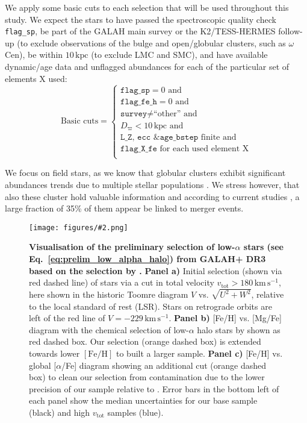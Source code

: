 \documentclass[fleqn,usenatbib]{mnras}
\newcommand{\kpc}{\,\mathrm{kpc}}	%
\newcommand{\kms}{\,\mathrm{km\,s^{-1}}}	%
\newcommand{\codeicon}{{\faCloudDownload}}
\newcommand{\codelink}[1]{\href{https://github.com/svenbuder/buder_galah_accreted_chemistry/tree/main/figures/#1.ipynb}{\codeicon}\,\,}
\newcommand{\oscaption}[2]{\caption{#2 \codelink{#1}}}
\newcommand{\figuretextwidth}[4]{\begin{figure*} \centering \texttt{[image: figures/\#2.png]}\oscaption{#3}{#4}\label{fig:#2} \end{figure*}}
\begin{document}
We apply some basic cuts to each selection that will be used throughout this study. We expect the stars to have passed the spectroscopic quality check \texttt{flag\_sp}, be part of the GALAH main survey or the K2/TESS-HERMES follow-up (to exclude observations of the bulge and open/globular clusters, such as $\omega$Cen), be within $10 \kpc$ (to exclude LMC and SMC), and have available dynamic/age data and unflagged abundances for each of the particular set of elements X used:\begin{equation} \label{eq:basic_cuts}
\text{Basic cuts} = 
\begin{cases}
\texttt{flag\_sp} = 0 \text{ and} \\
\texttt{flag\_fe\_h} = 0 \text{ and} \\
\texttt{survey} \neq \text{``other'' and} \\
D_\varpi < 10\kpc \text{ and} \\
\texttt{L\_Z}\text{, }\texttt{ecc}\text{ \& }\texttt{age\_bstep} \text{ finite and} \\
\texttt{flag\_X\_fe} \text{ for each used element X} \\
\end{cases}
\end{equation}

We focus on field stars, as we know that globular clusters exhibit significant abundances trends due to multiple stellar populations \citep[e.g.][]{Carretta2009}. We stress however, that also these cluster hold valuable information and according to current studies \citep[e.g.][]{Massari2019, KochHansen2021}, a large fraction of 35\% of them appear be linked to merger events.

\figuretextwidth{14.75cm}{nissen_selection_corner}{chemical_differences}{
\textbf{Visualisation of the preliminary selection of low-$\alpha$ stars (see Eq.~\ref{eq:prelim_low_alpha_halo}) from GALAH+ DR3 based on the selection by \citet{Nissen2010}.}
\textbf{Panel a)} Initial selection (shown via red dashed line) of stars via a cut in total velocity $v_\text{tot} > 180\,\mathrm{km\,s^{-1}}$, here shown in the historic Toomre diagram $V$ vs. $\sqrt{U^2 + W^2}$, relative to the local standard of rest (LSR). Stars on retrograde orbits are left of the red line of $V = -229\kms$.
\textbf{Panel b)} [Fe/H] vs. [Mg/Fe] diagram with the chemical selection of low-$\alpha$ halo stars by \citet{Nissen2010} shown as red dashed box. Our selection (orange dashed box) is extended towards lower $\mathrm{[Fe/H]}$ to built a larger sample.
\textbf{Panel c)} [Fe/H] vs. global [$\alpha$/Fe]  diagram showing an additional cut (orange dashed box) to clean our selection from contamination due to the lower precision of our sample relative to \citet{Nissen2010}.
Error bars in the bottom left of each panel show the median uncertainties for our base sample (black) and high $v_\text{tot}$ samples (blue).
}
\end{document}
